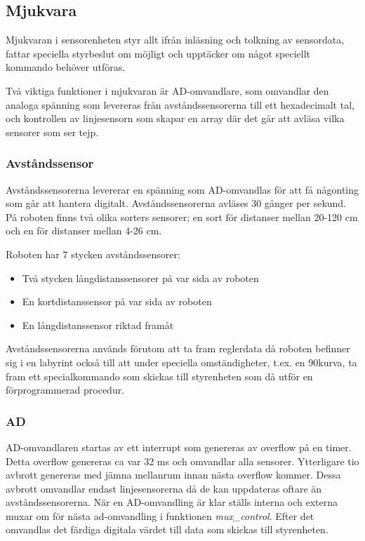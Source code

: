 \subsection{Mjukvara}

Mjukvaran i sensorenheten styr allt ifrån inläsning och tolkning av sensordata, fattar 
speciella styrbeslut om möjligt och upptäcker om något speciellt kommando behöver utföras.

Två viktiga funktioner i mjukvaran är AD-omvandlare, som omvandlar den analoga spänning
som levereras från avståndssensorerna till ett hexadecimalt tal, och kontrollen av linjesensorn
som skapar en array där det går att avläsa vilka sensorer som ser tejp.

\subsubsection{Avståndssensor}
Avståndssensorerna levererar en spänning som AD-omvandlas för att få någonting som går att
hantera digitalt. Avståndssensorerna avläses 30 gånger per sekund. På roboten finns två 
olika sorters sensorer; en sort för distanser mellan 20-120 cm och en för distanser mellan 4-26 cm.

Roboten har 7 stycken avståndssensorer:

\begin{itemize}
\item Två stycken långdistanssensorer på var sida av roboten
\item En kortdistanssensor på var sida av roboten
\item En långdistanssensor riktad framåt
\end{itemize} 

Avståndssensorerna används förutom att ta fram reglerdata då roboten befinner sig i en labyrint 
också till att under speciella omständigheter, t.ex. en 90\degree kurva, ta fram ett specialkommando
som skickas till styrenheten som då utför en förprogrammerad procedur.

\subsubsection{AD}
AD-omvandlaren startas av ett interrupt som genereras av overflow på en timer.
Detta overflow genereras ca var 32 ms och omvandlar alla sensorer. 
Ytterligare tio avbrott genereras med jämna mellanrum innan nästa overflow 
kommer. Dessa avbrott omvandlar endast linjesensorerna då de kan uppdateras
oftare än avståndssensorerna. När en AD-omvandling är klar ställs interna och 
externa muxar om för nästa ad-omvandling i funktionen \emph{mux\_control}. Efter 
det omvandlas det färdiga digitala värdet till data som skickas till
styrenheten.

